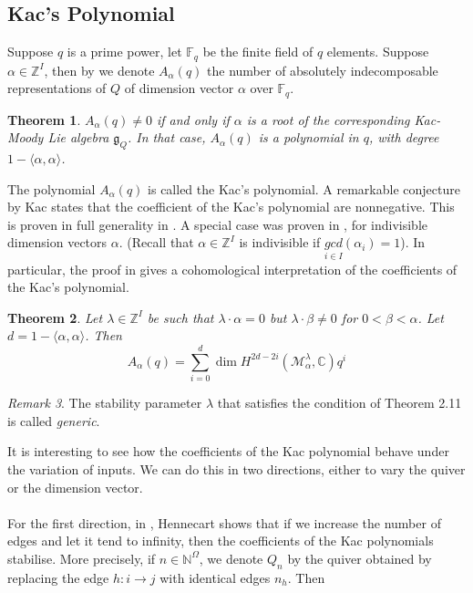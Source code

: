 \documentclass[12pt]{amsart}
\theoremstyle{plain}
\newtheorem{thm}{Theorem}[section]
\theoremstyle{definition}
\theoremstyle{remark}
\newtheorem{rem}[thm]{Remark}
\begin{document}
\subsection{Kac's Polynomial}
Suppose $q$ is a prime power, let $\mathbb F_q$ be the finite field of $q$ elements. Suppose $\alpha\in\mathbb Z^I$, then by we denote $A_{\alpha}(q)$ the number of absolutely indecomposable representations of $Q$ of dimension vector $\alpha$ over $\mathbb F_q$. 
\begin{thm}
    \cite{kac1983root} $A_{\alpha}(q)\neq 0$ if and only if $\alpha$ is a root of the corresponding Kac-Moody Lie algebra $\mathfrak{g}_{Q}$. In that case, $A_{\alpha}(q)$ is a polynomial in $q$, with degree $1-\langle\alpha,\alpha\rangle$.
\end{thm}
\hspace{-13pt}The polynomial $A_{\alpha}(q)$ is called the Kac's polynomial. A remarkable conjecture by Kac states that the coefficient of the Kac's polynomial are nonnegative. This is proven in full generality in \cite{hausel2013positivity}. A special case was proven in \cite{crawley2004absolutely}, for indivisible dimension vectors $\alpha$. (Recall that $\alpha\in\mathbb Z^I$ is indivisible if $\displaystyle \underset{i\in I}{gcd}(\alpha_i)=1$). In particular, the proof in \cite{crawley2004absolutely} gives a cohomological interpretation of the coefficients of the Kac's polynomial.
\begin{thm}
    \cite[Theorem 1.1]{crawley2004absolutely} Let $\lambda\in\mathbb Z^I$ be such that $\lambda\cdot\alpha=0$ but $\lambda\cdot\beta\neq 0$ for $0<\beta<\alpha$. Let $d=1-\langle\alpha,\alpha\rangle$. Then
    $$A_{\alpha}(q)=\sum_{i=0}^d\dim H^{2d-2i}(\mathcal{M}_{\alpha}^{\lambda},\mathbb C)q^i$$
\end{thm}
\begin{rem}
    The stability parameter $\lambda$ that satisfies the condition of Theorem 2.11 is called \emph{generic}.
\end{rem}
\hspace{-12pt}It is interesting to see how the coefficients of the Kac polynomial behave under the variation of inputs. We can do this in two directions, either to vary the quiver or the dimension vector.
\\~\\ For the first direction, in \cite{hennecart2021asymptotic}, Hennecart shows that if we increase the number of edges and let it tend to infinity, then the coefficients of the Kac polynomials stabilise. More precisely, if $n\in\mathbb N^{\Omega}$, we denote $Q_{n}$ by the quiver obtained by replacing the edge $h:i\to j$ with identical edges $n_{h}$. Then
\end{document}
